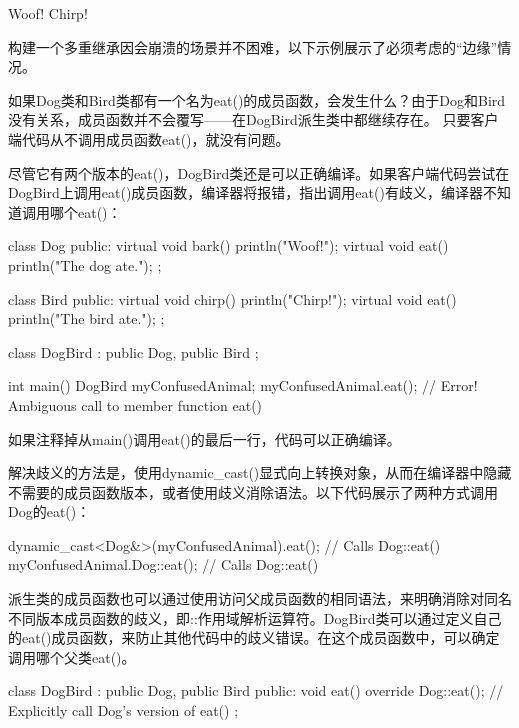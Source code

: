 \begin{shell}
Woof!
Chirp!
\end{shell}


构建一个多重继承因会崩溃的场景并不困难，以下示例展示了必须考虑的“边缘”情况。


如果Dog类和Bird类都有一个名为eat()的成员函数，会发生什么？由于Dog和Bird没有关系，成员函数并不会覆写——在DogBird派生类中都继续存在。 只要客户端代码从不调用成员函数eat()，就没有问题。

尽管它有两个版本的eat()，DogBird类还是可以正确编译。如果客户端代码尝试在DogBird上调用eat()成员函数，编译器将报错，指出调用eat()有歧义，编译器不知道调用哪个eat()：

\begin{cpp}
class Dog
{
    public:
        virtual void bark() { println("Woof!"); }
        virtual void eat() { println("The dog ate."); }
};

class Bird
{
    public:
        virtual void chirp() { println("Chirp!"); }
        virtual void eat() { println("The bird ate."); }
};

class DogBird : public Dog, public Bird
{
};

int main()
{
    DogBird myConfusedAnimal;
    myConfusedAnimal.eat(); // Error! Ambiguous call to member function eat()
}
\end{cpp}

如果注释掉从main()调用eat()的最后一行，代码可以正确编译。

解决歧义的方法是，使用dynamic\_cast()显式向上转换对象，从而在编译器中隐藏不需要的成员函数版本，或者使用歧义消除语法。以下代码展示了两种方式调用Dog的eat()：

\begin{cpp}
dynamic_cast<Dog&>(myConfusedAnimal).eat(); // Calls Dog::eat()
myConfusedAnimal.Dog::eat(); // Calls Dog::eat()
\end{cpp}

派生类的成员函数也可以通过使用访问父成员函数的相同语法，来明确消除对同名不同版本成员函数的歧义，即::作用域解析运算符。DogBird类可以通过定义自己的eat()成员函数，来防止其他代码中的歧义错误。在这个成员函数中，可以确定调用哪个父类eat()。

\begin{cpp}
class DogBird : public Dog, public Bird
{
    public:
        void eat() override
        {
            Dog::eat(); // Explicitly call Dog's version of eat()
        }
};
\end{cpp}

